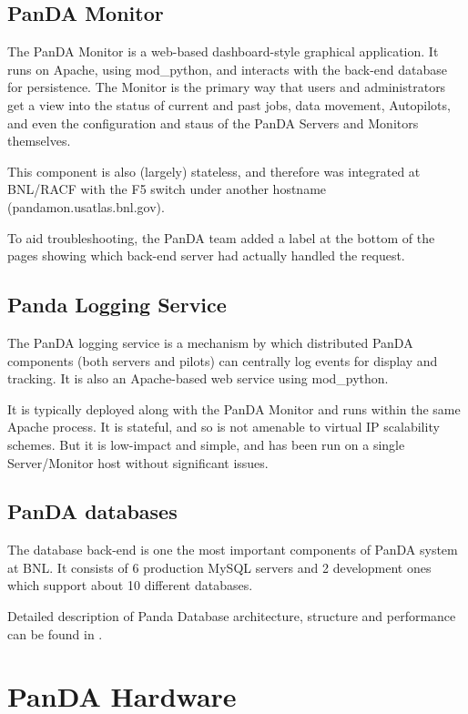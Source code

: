 \documentclass[letterpaper]{jpconf}
\begin{document}
\subsection{PanDA Monitor}

The PanDA Monitor is a web-based dashboard-style graphical application. It runs
on Apache, using mod\_python, and interacts with the back-end database for
persistence. The Monitor is the primary way that users and administrators get a
view into the status of current and past jobs, data movement, Autopilots, and
even the configuration and staus of the PanDA Servers and Monitors themselves. 

This component is also (largely) stateless, and therefore was integrated at
BNL/RACF with the F5 switch under another hostname (pandamon.usatlas.bnl.gov). 

To aid troubleshooting, the PanDA team added a label at the bottom of the pages
showing which back-end server had actually handled the request. 


\subsection{Panda Logging Service}

The PanDA logging service is a mechanism by which distributed PanDA components
(both servers and pilots) can centrally log events for display and tracking. It
is also an Apache-based web service using mod\_python. 

It is typically deployed along with the PanDA Monitor and runs within the same
Apache process. It is stateful, and so is not amenable to virtual IP scalability
schemes. But it is low-impact and simple, and has been run on a single
Server/Monitor host without significant issues.


\subsection{PanDA databases}

The database back-end is one the most important components of PanDA system at BNL. It consists 
of 6 production MySQL servers and 2 development ones which support about 10 different databases. 

Detailed description of Panda Database architecture, structure and performance can be found in 
 \cite{pandadbchep09}.


\section{PanDA Hardware}
\end{document}
